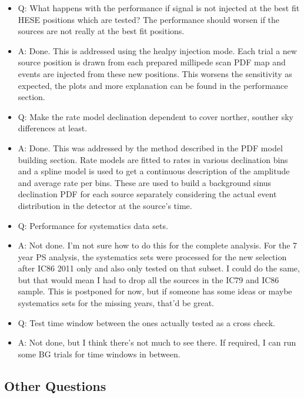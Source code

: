 \begin{itemize}
      \item Q:
        What happens with the performance if signal is not injected at the best fit HESE positions which are tested?
        The performance should worsen if the sources are not really at the best fit positions.
      \item A:
        Done.
        This is addressed using the healpy injection mode.
        Each trial a new source position is drawn from each prepared millipede scan PDF map and events are injected from these new positions.
        This worsens the sensitivity as expected, the plots and more explanation can be found in the performance section.

      \item Q:
        Make the rate model declination dependent to cover norther, souther sky differences at least.
      \item A:
        Done.
        This was addressed by the method described in the PDF model building section.
        Rate models are fitted to rates in various declination bins and a spline model is used to get a continuous description of the amplitude and average rate per bins.
        These are used to build a background sinus declination PDF for each source separately considering the actual event distribution in the detector at the source's time.

      \item Q:
        Performance for systematics data sets.
      \item A:
        \textcolor{nordorange}{Not done}.
        I'm not sure how to do this for the complete analysis.
        For the 7 year PS analysis, the systematics sets were processed for the new selection after IC86 2011 only and also only tested on that subset.
        I could do the same, but that would mean I had to drop all the sources in the IC79 and IC86 sample.
        This is postponed for now, but if someone has some ideas or maybe systematics sets for the missing years, that'd be great.

      \item Q:
        Test time window between the ones actually tested as a cross check.
      \item A:
        \textcolor{nordorange}{Not done}, but I think there's not much to see there.
        If required, I can run some BG trials for time windows in between.
  \end{itemize}

\subsection*{Other Questions}
